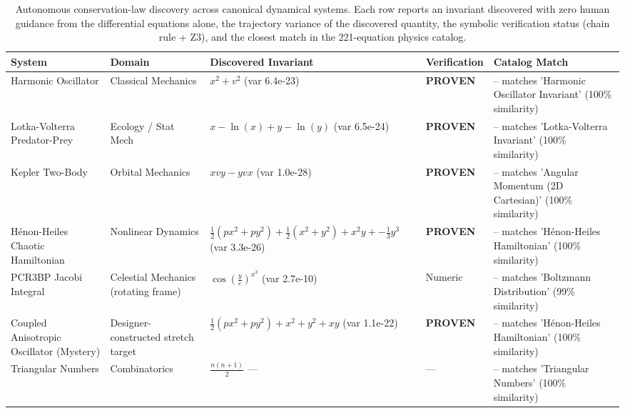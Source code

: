 \begin{table}[htbp]
\centering
\caption{Autonomous conservation-law discovery across canonical dynamical systems. Each row reports an invariant discovered with zero human guidance from the differential equations alone, the trajectory variance of the discovered quantity, the symbolic verification status (chain rule + Z3), and the closest match in the 221-equation physics catalog.}
\label{tab:ramanujan_showcase}
\begin{tabular}{lllll}
\toprule
System & Domain & Discovered Invariant & Verification & Catalog Match \\
\midrule
Harmonic Oscillator & Classical Mechanics & $x^{2} + v^{2}$ (var 6.4e-23) & \textbf{PROVEN} & -- matches 'Harmonic Oscillator Invariant' (100\% similarity) \\
Lotka-Volterra Predator-Prey & Ecology / Stat Mech & $x - \ln\left(x\right) + y - \ln\left(y\right)$ (var 6.5e-24) & \textbf{PROVEN} & -- matches 'Lotka-Volterra Invariant' (100\% similarity) \\
Kepler Two-Body & Orbital Mechanics & $x vy - y vx$ (var 1.0e-28) & \textbf{PROVEN} & -- matches 'Angular Momentum (2D Cartesian)' (100\% similarity) \\
Hénon-Heiles Chaotic Hamiltonian & Nonlinear Dynamics & $\frac{1}{2} \left(px^{2} + py^{2}\right) + \frac{1}{2} \left(x^{2} + y^{2}\right) + x^{2} y + -\frac{1}{3} y^{3}$ (var 3.3e-26) & \textbf{PROVEN} & -- matches 'Hénon-Heiles Hamiltonian' (100\% similarity) \\
PCR3BP Jacobi Integral & Celestial Mechanics (rotating frame) & $\cos\left(\frac{y}{e}\right)^{x^{3}}$ (var 2.7e-10) & Numeric & -- matches 'Boltzmann Distribution' (99\% similarity) \\
Coupled Anisotropic Oscillator (Mystery) & Designer-constructed stretch target & $\frac{1}{2} \left(px^{2} + py^{2}\right) + x^{2} + y^{2} + x y$ (var 1.1e-22) & \textbf{PROVEN} & -- matches 'Hénon-Heiles Hamiltonian' (100\% similarity) \\
Triangular Numbers & Combinatorics & $\frac{n \left(n + 1\right)}{2}$ — & — & -- matches 'Triangular Numbers' (100\% similarity) \\
\bottomrule
\end{tabular}
\end{table}
